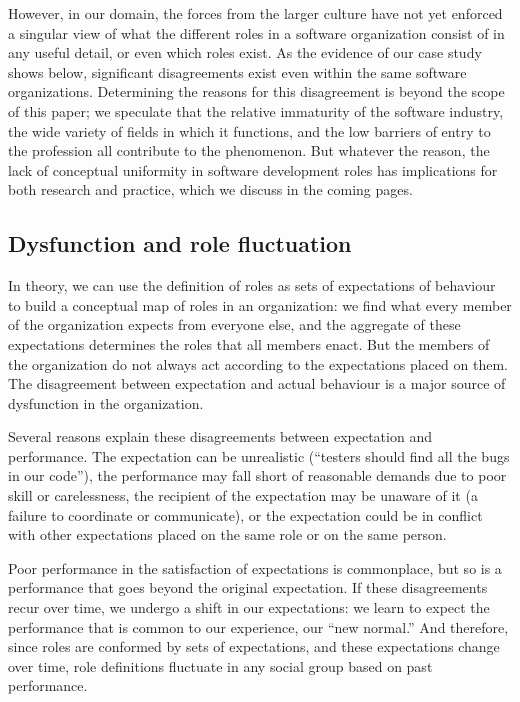 \documentclass[10pt, conference, compsocconf]{IEEEtran}
\begin{document}
However, in our domain, the forces from the larger culture have not yet enforced a singular view of what the different roles in a software organization consist of in any useful detail, or even which roles exist. As the evidence of our case study shows below, significant disagreements exist even within the same software organizations. Determining the reasons for this disagreement is beyond the scope of this paper; we speculate that the relative immaturity of the software industry, the wide variety of fields in which it functions, and the low barriers of entry to the profession all contribute to the phenomenon. But whatever the reason, the lack of conceptual uniformity in software development roles has implications for both research and practice, which we discuss in the coming pages.


\subsection{Dysfunction and role fluctuation}

In theory, we can use the definition of roles as sets of expectations of behaviour to build a conceptual map of roles in an organization: we find what every member of the organization expects from everyone else, and the aggregate of these expectations determines the roles that all members enact. But the members of the organization do not always act according to the expectations placed on them. The disagreement between expectation and actual behaviour is a major source of dysfunction in the organization.

Several reasons explain these disagreements between expectation and performance. The expectation can be unrealistic (``testers should find all the bugs in our code''), the performance may fall short of reasonable demands due to poor skill or carelessness, the recipient of the expectation may be unaware of it (a failure to coordinate or communicate), or the expectation could be in conflict with other expectations placed on the same role or on the same person.

Poor performance in the satisfaction of expectations is commonplace, but so is a performance that goes beyond the original expectation. If these disagreements recur over time, we undergo a shift in our expectations: we learn to expect the performance that is common to our experience, our ``new normal.'' And therefore, since roles are conformed by sets of expectations, and these expectations change over time, role definitions fluctuate in any social group based on past performance. 
\end{document}
